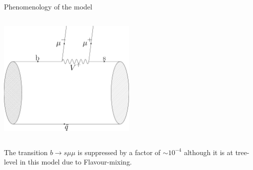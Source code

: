 \documentclass[9pt,usenames,dvipsnames]{beamer}
\begin{document}
\begin{frame}{Phenomenology of the model }
\begin{columns}[c]
\begin{center}
			\includegraphics[width= 0.5\textwidth]{./assets/B_to_K_treeLQ}
		\end{center}
	\end{columns}
	The transition $ b \to s \mu \mu$ is suppressed by a factor of $\sim 10^{-4}$ although it is at tree-level in this model due to Flavour-mixing.
\end{frame}
\end{document}
